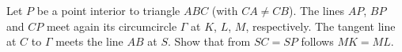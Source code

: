 Let $P$ be a point interior to triangle $ABC$ (with $CA \neq CB$).
The lines $AP$, $BP$ and $CP$ meet again its circumcircle $\Gamma$
at $K$, $L$, $M$, respectively.
The tangent line at $C$ to $\Gamma$ meets the line $AB$ at $S$.
Show that from $SC = SP$ follows $MK = ML$.